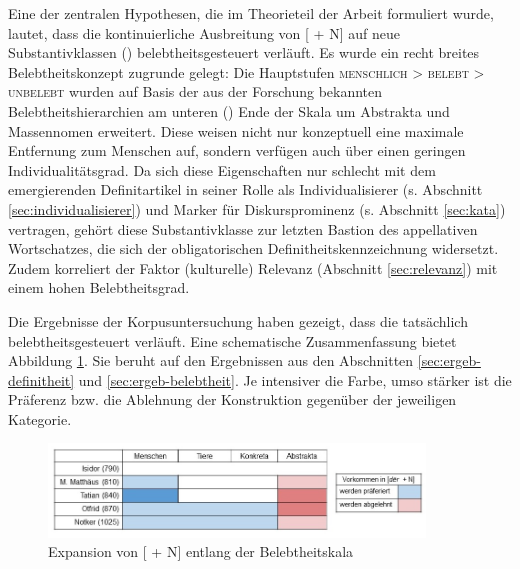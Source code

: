 Eine der zentralen Hypothesen, die im Theorieteil der Arbeit formuliert wurde, lautet, dass die kontinuierliche Ausbreitung von [ + N] auf neue Substantivklassen () belebtheitsgesteuert verläuft. Es wurde ein recht breites Belebtheitskonzept zugrunde gelegt: Die Hauptstufen \textsc{menschlich > belebt > unbelebt} wurden auf Basis der aus der Forschung bekannten Belebtheitshierarchien \parencite[u.a.][]{Comrie1989,Yamamoto1999,Croft2006,Enger2011} am unteren () Ende der Skala um Abstrakta und Massennomen erweitert. Diese weisen nicht nur konzeptuell eine maximale Entfernung zum Menschen auf, sondern verfügen auch über einen geringen Individualitätsgrad. Da sich diese Eigenschaften nur schlecht mit dem emergierenden Definitartikel in seiner Rolle als Individualisierer (s. Abschnitt \ref{sec:individualisierer}) und Marker für Diskursprominenz (s. Abschnitt \ref{sec:kata}) vertragen, gehört diese Substantivklasse zur letzten Bastion des appellativen Wortschatzes, die sich der obligatorischen Definitheitskennzeichnung widersetzt. Zudem korreliert der Faktor (kulturelle) Relevanz (Abschnitt \ref{sec:relevanz}) mit einem hohen Belebtheitsgrad. 

Die Ergebnisse der Korpusuntersuchung haben gezeigt, dass die  tatsächlich belebtheitsgesteuert verläuft. Eine schematische Zusammenfassung bietet Abbildung \ref{abb:expansion-belebtheit}. Sie beruht auf den Ergebnissen aus den Abschnitten \ref{sec:ergeb-definitheit} und \ref{sec:ergeb-belebtheit}. Je intensiver die Farbe, umso stärker ist die Präferenz bzw. die Ablehnung der Konstruktion gegenüber der jeweiligen Kategorie. 

\begin{figure}
\begin{center}
  \includegraphics[width=10cm]{images/belebtheitsexpansion-neu.jpg}
\caption {Expansion von [ + N] entlang der Belebtheitskala} 
\label{abb:expansion-belebtheit}
\end{center}
\end{figure} 
  
